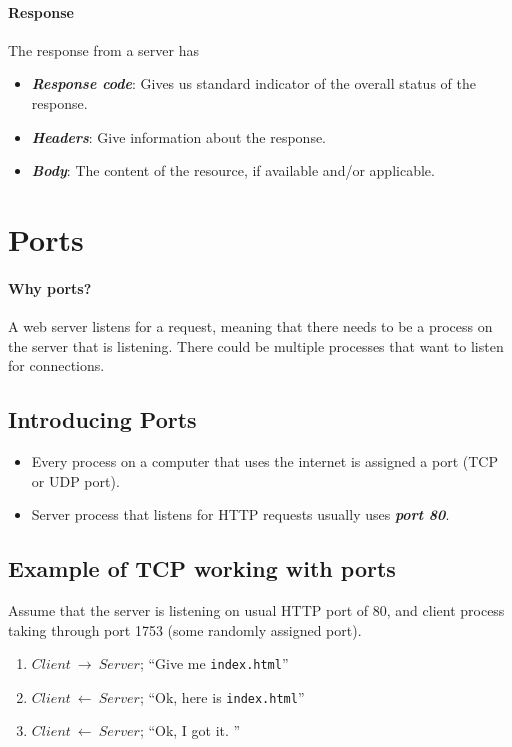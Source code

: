\documentclass[10pt]{article}
\begin{document}
\paragraph{Response} The response from a server has
\begin{itemize}
    \item \textit{\textbf{Response code}}: Gives us standard indicator of the overall status of the response.
    \item \textit{\textbf{Headers}}: Give information about the response.
    \item \textit{\textbf{Body}}: The content of the resource, if available and/or applicable.
\end{itemize}

\section{Ports}
\paragraph{Why ports?} A web server listens for a request, meaning that there needs to be a process on the server that is listening. There could be multiple processes that want to listen for connections. 

\subsection{Introducing Ports}
\begin{itemize}
    \item Every process on a computer that uses the internet is assigned a port (TCP or UDP port).
    \item Server process that listens for HTTP requests usually uses \textit{\textbf{port 80}}. 
\end{itemize} 

\subsection{Example of TCP working with ports}
Assume that the server is listening on usual HTTP port of 80, and client process taking through port 1753 (some randomly assigned port).
\begin{enumerate}
    \item $Client ~{\longrightarrow}~Server$; ``Give me \texttt{index.html}''
    \item $Client ~{{\longleftarrow}}~Server$; ``Ok, here is \texttt{index.html}''
    \item $Client ~{{\longleftarrow}}~ Server$; ``Ok, I got it. ''
\end{enumerate}
\end{document}
